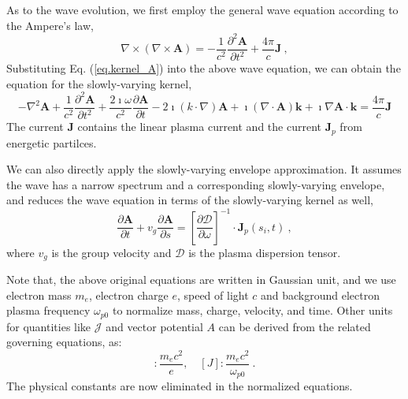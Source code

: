 


As to the wave evolution, we first employ the general wave equation according to the Ampere's law,
\begin{equation}\label{eq.ori_wave}
    \nabla \times \left(\nabla \times \mathbf{A} \right) = -\frac{1}{c^2} \frac{\partial^2\mathbf{A}}{\partial t^2}  + \frac{4\pi}{c}\mathbf{J}~,
\end{equation}
Substituting Eq. (\ref{eq.kernel_A}) into the above wave equation, we can obtain the equation for the slowly-varying kernel,
\begin{equation}\label{eq.W2nd}
    -\nabla^2\mathbf{A} + \frac{1}{c^2} \frac{\partial^2 \mathbf{A}}{\partial t^2} + \frac{2\imath \omega}{c^2} \frac{\partial \mathbf{A}}{\partial t} - 2 \imath\left(k \cdot \nabla\right) \mathbf{A}+\imath\left(\nabla \cdot \mathbf{A}\right) \mathbf{k}+\imath \nabla \mathbf{A}\cdot \mathbf{k} = \frac{4 \pi}{c} \mathbf{J}
\end{equation}
The current $\mathbf{J} $ contains the linear plasma current and the current $\mathbf{J}_p$ from energetic partilces.


We can also directly apply the slowly-varying envelope approximation. It assumes the wave has a narrow spectrum and a corresponding slowly-varying envelope, and reduces the wave equation in terms of the slowly-varying kernel as well,
\begin{equation}\label{eq.W1st}
    \frac{\partial\mathbf{A}}{\partial t} + v_g \frac{\partial\mathbf{A}}{\partial s} = \left[\frac{\partial\mathcal{D}}{\partial \omega}\right]^{-1}\cdot \mathbf{J}_p(s_i,t)~,
\end{equation}
where $v_g$ is the group velocity and $\mathcal{D}$ is the plasma dispersion tensor.

Note that, the above original equations are written in Gaussian unit, and we use electron mass $m_e$, electron charge $e$, speed of light $c$ and background electron plasma frequency $\omega_{p0}$ to normalize mass, charge, velocity, and time. Other units for quantities like $\mathcal{J}$ and vector potential $A$ can be derived from the related governing equations, as:
\begin{equation}
    [A]: \frac{m_e c^2}{e}, \quad[J]: \frac{m_e c^2}{\omega_{p 0}}~.
\end{equation}
The physical constants are now eliminated in the normalized equations.

\fi